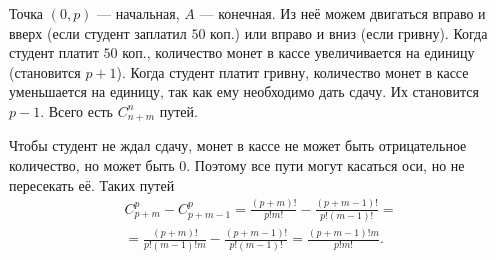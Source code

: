Точка $ \left( 0, p \right) $ --- начальная, $A$ --- конечная.
Из неё можем двигаться вправо и вверх (если студент заплатил $50$ коп.) или вправо и вниз (если гривну).
Когда студент платит $50$ коп., количество монет в кассе увеличивается на единицу (становится $p + 1$).
Когда студент платит гривну, количество монет в кассе уменьшается на единицу, так как ему необходимо дать сдачу.
Их становится $p - 1$.
Всего есть $C_{n+m}^n$ путей.

Чтобы студент не ждал сдачу, монет в кассе не может быть отрицательное количество, но может быть 0.
Поэтому все пути могут касаться оси, но не пересекать её.
Таких путей 
\begin{equation*}
\begin{split}
C_{p+m}^p - C_{p+m-1}^p =
\frac{ \left( p+m \right)!}{p!m!} - \frac{ \left( p+m-1 \right)!}{p! \left( m-1 \right)!} = \\
= \frac{ \left( p+m \right)!}{p! \left( m-1 \right)! m} - \frac{ \left( p+m-1 \right)!}{p! \left( m-1 \right)!} =
\frac{ \left( p+m-1 \right)!m}{p!m!}.
\end{split}
\end{equation*}
